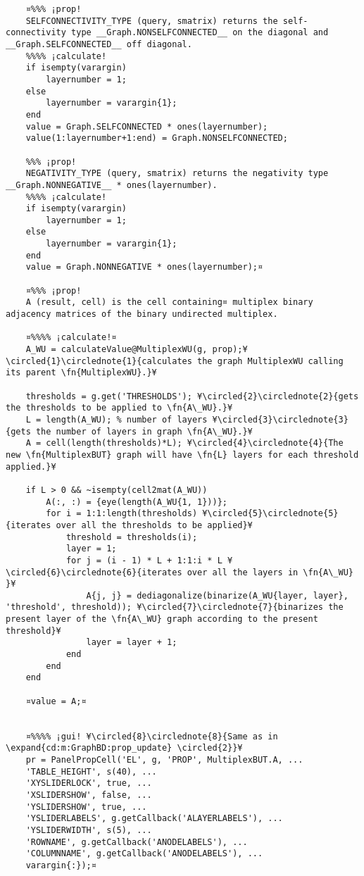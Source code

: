 \documentclass{tufte-handout}
\begin{document}
\begin{lstlisting}
	¤%%% ¡prop!
	SELFCONNECTIVITY_TYPE (query, smatrix) returns the self-connectivity type __Graph.NONSELFCONNECTED__ on the diagonal and __Graph.SELFCONNECTED__ off diagonal.
	%%%% ¡calculate!
	if isempty(varargin)
		layernumber = 1;
	else
		layernumber = varargin{1};
	end
	value = Graph.SELFCONNECTED * ones(layernumber);
	value(1:layernumber+1:end) = Graph.NONSELFCONNECTED;                
	
	%%% ¡prop!
	NEGATIVITY_TYPE (query, smatrix) returns the negativity type __Graph.NONNEGATIVE__ * ones(layernumber).
	%%%% ¡calculate!
	if isempty(varargin)
		layernumber = 1;
	else
		layernumber = varargin{1};
	end
	value = Graph.NONNEGATIVE * ones(layernumber);¤
	
	¤%%% ¡prop!
	A (result, cell) is the cell containing¤ multiplex binary adjacency matrices of the binary undirected multiplex.
	
	¤%%%% ¡calculate!¤
	A_WU = calculateValue@MultiplexWU(g, prop);¥\circled{1}\circlednote{1}{calculates the graph MultiplexWU calling its parent \fn{MultiplexWU}.}¥
	
	thresholds = g.get('THRESHOLDS'); ¥\circled{2}\circlednote{2}{gets the thresholds to be applied to \fn{A\_WU}.}¥
	L = length(A_WU); % number of layers ¥\circled{3}\circlednote{3}{gets the number of layers in graph \fn{A\_WU}.}¥
	A = cell(length(thresholds)*L); ¥\circled{4}\circlednote{4}{The new \fn{MultiplexBUT} graph will have \fn{L} layers for each threshold applied.}¥
	
	if L > 0 && ~isempty(cell2mat(A_WU))
		A(:, :) = {eye(length(A_WU{1, 1}))};
		for i = 1:1:length(thresholds) ¥\circled{5}\circlednote{5}{iterates over all the thresholds to be applied}¥
			threshold = thresholds(i);
			layer = 1;
			for j = (i - 1) * L + 1:1:i * L ¥\circled{6}\circlednote{6}{iterates over all the layers in \fn{A\_WU} }¥
				A{j, j} = dediagonalize(binarize(A_WU{layer, layer}, 'threshold', threshold)); ¥\circled{7}\circlednote{7}{binarizes the present layer of the \fn{A\_WU} graph according to the present threshold}¥
				layer = layer + 1;
			end
		end
	end
	
	¤value = A;¤


	¤%%%% ¡gui! ¥\circled{8}\circlednote{8}{Same as in \expand{cd:m:GraphBD:prop_update} \circled{2}}¥
	pr = PanelPropCell('EL', g, 'PROP', MultiplexBUT.A, ...
	'TABLE_HEIGHT', s(40), ...
	'XYSLIDERLOCK', true, ... 
	'XSLIDERSHOW', false, ...
	'YSLIDERSHOW', true, ...
	'YSLIDERLABELS', g.getCallback('ALAYERLABELS'), ...
	'YSLIDERWIDTH', s(5), ...
	'ROWNAME', g.getCallback('ANODELABELS'), ...
	'COLUMNNAME', g.getCallback('ANODELABELS'), ...
	varargin{:});¤
	

\end{lstlisting}
\end{document}

